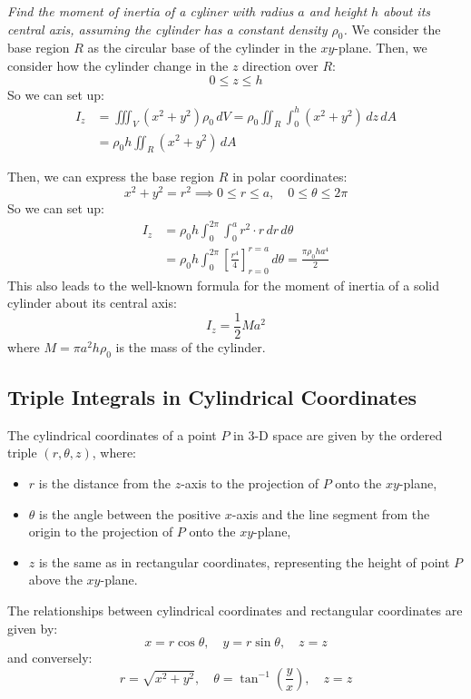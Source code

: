 \documentclass[11pt]{report}
\begin{document}
\begin{example}
    \textit{Find the moment of inertia of a cyliner with radius $a$ and height $h$ about its central axis, assuming the cylinder has a constant density $\rho_0$.}
    We consider the base region $R$ as the circular base of the cylinder in the $xy$-plane. Then, we consider how the cylinder change in the $z$ direction over $R$:
    $$
        0 \le z \le h
    $$
    So we can set up:
    \begin{align*}
        I_z &= \iiint_V (x^2 + y^2) \rho_0 \, dV = \rho_0 \iint_R \int_0^h (x^2 + y^2) \, dz \, dA \\
        &= \rho_0 h \iint_R (x^2 + y^2) \, dA
    \end{align*}

    Then, we can express the base region $R$ in polar coordinates:
    $$        
    x^2 + y^2 = r^2 \implies 0 \le r \le a, \quad 0 \le \theta \le 2\pi
    $$
    So we can set up:
    \begin{align*}
        I_z &= \rho_0 h \int_0^{2\pi} \int_0^a r^2 \cdot r \, dr \, d\theta \\
        &= \rho_0 h \int_0^{2\pi} \left[ \frac{r^4}{4} \right]_{r=0}^{r=a} \, d\theta = \frac{\pi \rho_0 h a^4}{2}
    \end{align*}
    This also leads to the well-known formula for the moment of inertia of a solid cylinder about its central axis:
    $$
        I_z = \frac{1}{2} M a^2
    $$
    where $M = \pi a^2 h \rho_0$ is the mass of the cylinder. 
\end{example}
\subsection{Triple Integrals in Cylindrical Coordinates}
\begin{definition}
    The cylindrical coordinates of a point $P$ in 3-D space are given by the ordered triple $(r, \theta, z)$, where:
    \begin{itemize}
        \item $r$ is the distance from the $z$-axis to the projection of $P$ onto the $xy$-plane,
        \item $\theta$ is the angle between the positive $x$-axis and the line segment from the origin to the projection of $P$ onto the $xy$-plane,
        \item $z$ is the same as in rectangular coordinates, representing the height of point $P$ above the $xy$-plane.
    \end{itemize}
    The relationships between cylindrical coordinates and rectangular coordinates are given by:
    \begin{equation}
        x = r \cos \theta, \quad y = r \sin \theta, \quad z = z
    \end{equation}
    and conversely:
    \begin{equation}
        r = \sqrt{x^2 + y^2}, \quad \theta = \tan^{-1}\left(\frac{y}{x}\right), \quad z = z
    \end{equation}
\end{definition}
\end{document}
